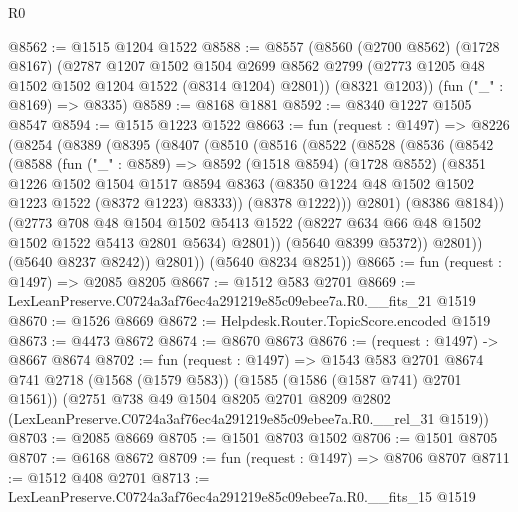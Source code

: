 \begin{lexlean}{R0}
\begin{coremodule}
@8562 := @1515 @1204 @1522
@8588 := @8557
    (@8560
      (@2700 @8562)
      (@1728 @8167)
      (@2787
        @1207
        @1502
        @1504
        @2699
        @8562
        @2799
        (@2773 @1205 @48 @1502 @1502 @1204 @1522 (@8314 @1204) @2801))
      (@8321 @1203))
    (fun ("_" : @8169) => @8335)
@8589 := @8168 @1881
@8592 := @8340 @1227 @1505 @8547
@8594 := @1515 @1223 @1522
@8663 := fun (request : @1497) =>
  @8226
    (@8254
      (@8389
        (@8395
          (@8407
            (@8510
              (@8516
                (@8522
                  (@8528
                    (@8536
                      (@8542
                        (@8588
                          (fun ("_" : @8589) =>
                          @8592
                            (@1518 @8594)
                            (@1728 @8552)
                            (@8351
                              @1226
                              @1502
                              @1504
                              @1517
                              @8594
                              @8363
                              (@8350 @1224 @48 @1502 @1502 @1223 @1522 (@8372 @1223) @8333))
                            (@8378 @1222)))
                        @2801)
                      (@8386 @8184))
                    (@2773
                      @708
                      @48
                      @1504
                      @1502
                      @5413
                      @1522
                      (@8227 @634 @66 @48 @1502 @1502 @1522 @5413 @2801 @5634)
                      @2801))
                  (@5640 @8399 @5372))
                @2801))
            (@5640 @8237 @8242))
          @2801))
      (@5640 @8234 @8251))
@8665 := fun (request : @1497) => @2085 @8205
@8667 := @1512 @583 @2701
@8669 := LexLeanPreserve.C0724a3af76ec4a291219e85c09ebee7a.R0.__fits_21 @1519
@8670 := @1526 @8669
@8672 := Helpdesk.Router.TopicScore.encoded @1519
@8673 := @4473 @8672
@8674 := @8670 @8673
@8676 := (request : @1497) -> @8667 @8674
@8702 := fun (request : @1497) =>
  @1543
    @583
    @2701
    @8674
    @741
    @2718
    (@1568 (@1579 @583))
    (@1585 (@1586 (@1587 @741) @2701 @1561))
    (@2751
      @738
      @49
      @1504
      @8205
      @2701
      @8209
      @2802
      (LexLeanPreserve.C0724a3af76ec4a291219e85c09ebee7a.R0.__rel_31 @1519))
@8703 := @2085 @8669
@8705 := @1501 @8703 @1502
@8706 := @1501 @8705
@8707 := @6168 @8672
@8709 := fun (request : @1497) => @8706 @8707
@8711 := @1512 @408 @2701
@8713 := LexLeanPreserve.C0724a3af76ec4a291219e85c09ebee7a.R0.__fits_15 @1519

\end{coremodule}
\end{lexlean}
